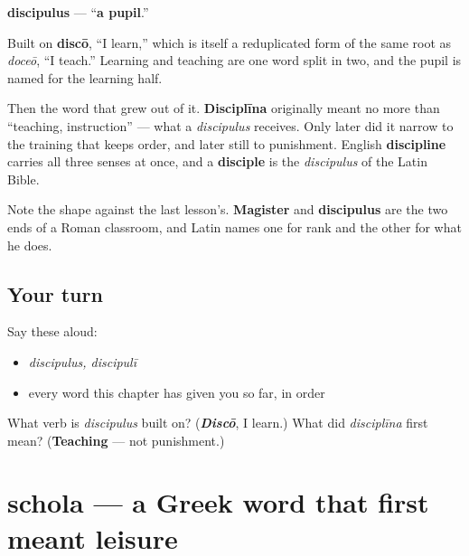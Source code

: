 \begin{cousinweb}
\textbf{discipulus} — \textquotedblleft{}\textbf{a pupil}.\textquotedblright{}

Built on \textbf{discō}, \textquotedblleft{}I learn,\textquotedblright{} which is itself a reduplicated form of the same root as \emph{doceō}, \textquotedblleft{}I teach.\textquotedblright{} Learning and teaching are one word split in two, and the pupil is named for the learning half.

Then the word that grew out of it. \textbf{Disciplīna} originally meant no more than \textquotedblleft{}teaching, instruction\textquotedblright{} — what a \emph{discipulus} receives. Only later did it narrow to the training that keeps order, and later still to punishment. English \textbf{discipline} carries all three senses at once, and a \textbf{disciple} is the \emph{discipulus} of the Latin Bible.

Note the shape against the last lesson's. \textbf{Magister} and \textbf{discipulus} are the two ends of a Roman classroom, and Latin names one for rank and the other for what he does.
\end{cousinweb}

\subsection*{Your turn}
Say these aloud:

\begin{itemize}
\raggedright
  \item \emph{discipulus, discipulī}
  \item every word this chapter has given you so far, in order
\end{itemize}

\begin{tcolorbox}[breakable,colback=teal!4,colframe=teal!35!black,title={Before you move on}]
What verb is \emph{discipulus} built on? (\emph{\textbf{Discō}}, I learn.) What did \emph{disciplīna} first mean? (\textbf{Teaching} — not punishment.)
\end{tcolorbox}
\section[schola, scholae]{schola — a Greek word that first meant leisure}

\label{lesson:LA-C53-schola}




